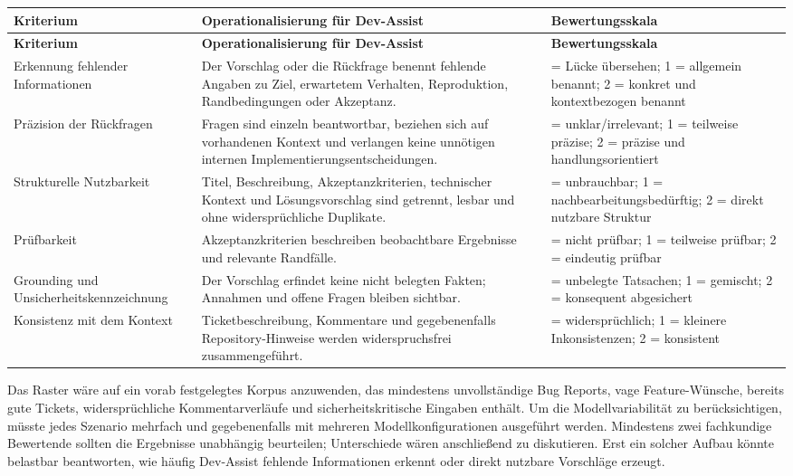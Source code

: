 \begin{longtable}{@{}>{\raggedright\arraybackslash}p{}>{\raggedright\arraybackslash}p{}>{\raggedright\arraybackslash}p{}@{}}
\toprule
\textbf{Kriterium} & \textbf{Operationalisierung für Dev-Assist} & \textbf{Bewertungsskala} \\
\midrule
\endfirsthead
\toprule
\textbf{Kriterium} & \textbf{Operationalisierung für Dev-Assist} & \textbf{Bewertungsskala} \\
\midrule
\endhead
Erkennung fehlender Informationen & Der Vorschlag oder die Rückfrage benennt fehlende Angaben zu Ziel, erwartetem Verhalten, Reproduktion, Randbedingungen oder Akzeptanz. & 0 = Lücke übersehen; 1 = allgemein benannt; 2 = konkret und kontextbezogen benannt \\
Präzision der Rückfragen & Fragen sind einzeln beantwortbar, beziehen sich auf vorhandenen Kontext und verlangen keine unnötigen internen Implementierungsentscheidungen. & 0 = unklar/irrelevant; 1 = teilweise präzise; 2 = präzise und handlungsorientiert \\
Strukturelle Nutzbarkeit & Titel, Beschreibung, Akzeptanzkriterien, technischer Kontext und Lösungsvorschlag sind getrennt, lesbar und ohne widersprüchliche Duplikate. & 0 = unbrauchbar; 1 = nachbearbeitungsbedürftig; 2 = direkt nutzbare Struktur \\
Prüfbarkeit & Akzeptanzkriterien beschreiben beobachtbare Ergebnisse und relevante Randfälle. & 0 = nicht prüfbar; 1 = teilweise prüfbar; 2 = eindeutig prüfbar \\
Grounding und Unsicherheitskennzeichnung & Der Vorschlag erfindet keine nicht belegten Fakten; Annahmen und offene Fragen bleiben sichtbar. & 0 = unbelegte Tatsachen; 1 = gemischt; 2 = konsequent abgesichert \\
Konsistenz mit dem Kontext & Ticketbeschreibung, Kommentare und gegebenenfalls Repository-Hinweise werden widerspruchsfrei zusammengeführt. & 0 = widersprüchlich; 1 = kleinere Inkonsistenzen; 2 = konsistent \\
\bottomrule
\end{longtable}

Das Raster wäre auf ein vorab festgelegtes Korpus anzuwenden, das mindestens unvollständige Bug Reports, vage Feature-Wünsche, bereits gute Tickets, widersprüchliche Kommentarverläufe und sicherheitskritische Eingaben enthält. Um die Modellvariabilität zu berücksichtigen, müsste jedes Szenario mehrfach und gegebenenfalls mit mehreren Modellkonfigurationen ausgeführt werden. Mindestens zwei fachkundige Bewertende sollten die Ergebnisse unabhängig beurteilen; Unterschiede wären anschließend zu diskutieren. Erst ein solcher Aufbau könnte belastbar beantworten, wie häufig Dev-Assist fehlende Informationen erkennt oder direkt nutzbare Vorschläge erzeugt.

